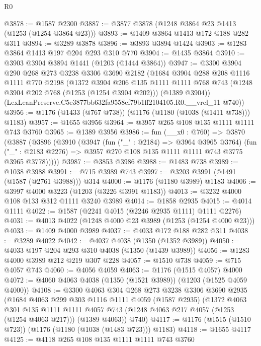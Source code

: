 \begin{lexlean}{R0}
\begin{coremodule}
@3878 := @1587 @2300
@3887 := @3877 @3878 (@1248 @3864 @23 @1413 (@1253 (@1254 @3864 @23)))
@3893 := @1409 @3864 @1413 @172 @188 @282 @311
@3894 := @3289 @3878
@3896 := @3893 @3894 @1424
@3903 := @1283 @3864 @1413 @197 @204 @293 @310 @770
@3904 := @1435 @3864
@3910 := @3903 @3904 @3894 @1441 (@1203 (@1444 @3864))
@3947 := @3300
    @3904
    @290
    @268
    @273
    @3238
    @3306
    @3690
    @2182
    (@1684
      @3904
      @288
      @208
      @1116
      @1111
      @770
      @2198
      (@1372
        @3904
        @206
        @135
        @1111
        @1111
        @768
        @743
        (@1248 @3904 @202 @768 (@1253 (@1254 @3904 @202)))
        (@1389 @3904))
      (LexLeanPreserve.C5e3877bb632fa9558ef79b1ff2104105.R0.__vrel_11 @740))
@3956 := @1176 (@1433 (@767 @738)) (@1176 (@1180 (@1038 (@1411 @738))) @1183)
@3957 := @1655 @3956
@3964 := @3957 @265 @108 @135 @1111 @1111 @743 @3760
@3965 := @1389 @3956
@3986 := fun (__x0 : @760) =>
  @3870
    (@3887
      (@3896
        (@3910
          (@3947
            (fun ("_" : @2184) => @3964 @3965 @3764)
            (fun ("_" : @2183 @2276) => @3957 @270 @108 @135 @1111 @1111 @743 @3775 @3965 @3778)))))
@3987 := @3853 @3986
@3988 := @1483 @738
@3989 := @1038 @3988
@3991 := @715 @3989 @743
@3997 := @3203 @3991 (@1491 (@1587 (@2761 @3988))) @314
@4000 := @1176 (@1180 @3989) @1183
@4006 := @3997 @4000 @3223 (@1203 (@3226 @3991 @1183))
@4013 := @3232 @4000 @108 @133 @312 @1111 @3240 @3989
@4014 := @1858 @2935
@4015 := @4014 @1111
@4022 := @1587 (@2241 @4015 (@2246 @2935 @1111) @1111 @2276)
@4031 := @4013 @4022 (@1248 @4000 @23 @3989 (@1253 (@1254 @4000 @23)))
@4033 := @1409 @4000 @3989
@4037 := @4033 @172 @188 @282 @311
@4038 := @3289 @4022
@4042 := @4037 @4038 (@1350 (@1352 @3989))
@4050 := @4033 @197 @204 @293 @310 @4038 (@1350 (@1439 @3989))
@4056 := @1283 @4000 @3989 @212 @219 @307 @228
@4057 := @1510 @738
@4059 := @715 @4057 @743
@4060 := @4056 @4059
@4063 := @1176 (@1515 @4057) @4000
@4072 := @4060 @4063 @4038 (@1350 (@1521 @3989)) (@1203 (@1525 @4059 @4000))
@4108 := @3300
    @4063
    @304
    @268
    @273
    @3238
    @3306
    @3690
    @2935
    (@1684
      @4063
      @299
      @303
      @1116
      @1111
      @4059
      (@1587 @2935)
      (@1372
        @4063
        @301
        @135
        @1111
        @1111
        @4057
        @743
        (@1248 @4063 @217 @4057 (@1253 (@1254 @4063 @217)))
        (@1389 @4063))
      @740)
@4117 := @1176 (@1515 (@1510 @723)) (@1176 (@1180 (@1038 (@1483 @723))) @1183)
@4118 := @1655 @4117
@4125 := @4118 @265 @108 @135 @1111 @1111 @743 @3760

\end{coremodule}
\end{lexlean}
